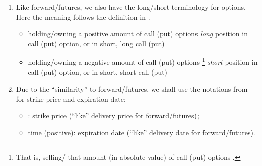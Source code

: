 \begin{enumerate}
\item Like forward/futures, we also have the long/short terminology for
options. Here the meaning follows the definition in
.
\begin{itemize}
\item holding/owning a positive amount of call (put) options 
 \emph{long} position in call (put) option, or in short,
long call (put)
\item holding/owning a negative amount of call (put) options
\footnote{That is, selling/ that amount (in
absolute value) of call (put) options .} 
\emph{short} position in call (put) option, or in short, short call (put)
\end{itemize}

\item Due to the ``similarity'' to forward/futures, we shall use the notations
from  for strike price and expiration date:
\begin{itemize}
\item {}: strike price (``like'' delivery price for forward/futures);
\item time  (positive): expiration date (``like'' delivery date for
forward/futures).
\end{itemize}
\end{enumerate}
